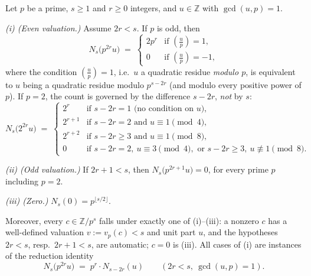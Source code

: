 \begin{lemma}\label{lem-3-2-6}
  \leanok
  Let $p$ be a prime, $s \geq 1$ and $r \geq 0$ integers, and $u \in \mathbb{Z}$
  with $\gcd(u,p) = 1$.

  \emph{(i) (Even valuation.)} Assume $2r < s$. If $p$ is odd, then
  \[
    N_s\bigl(p^{2r}u\bigr) \;=\;
    \begin{cases}
      2p^{r} & \text{if } \left(\frac{u}{p}\right) = 1,\\
      0      & \text{if } \left(\frac{u}{p}\right) = -1,
    \end{cases}
  \]
  where the condition $\left(\frac{u}{p}\right) = 1$, i.e.\ $u$ a quadratic residue
  \emph{modulo $p$}, is equivalent to $u$ being a quadratic residue modulo
  $p^{s-2r}$ (and modulo every positive power of $p$).
  If $p = 2$, the count is governed by the difference $s - 2r$, \emph{not} by $s$:
  \[
    N_s\bigl(2^{2r}u\bigr) \;=\;
    \begin{cases}
      2^{r}   & \text{if } s - 2r = 1 \text{ (no condition on } u\text{)},\\
      2^{r+1} & \text{if } s - 2r = 2 \text{ and } u \equiv 1 \pmod{4},\\
      2^{r+2} & \text{if } s - 2r \geq 3 \text{ and } u \equiv 1 \pmod{8},\\
      0       & \text{if } s - 2r = 2,\ u \equiv 3 \pmod{4},
                \text{ or } s - 2r \geq 3,\ u \not\equiv 1 \pmod{8}.
    \end{cases}
  \]

  \emph{(ii) (Odd valuation.)} If $2r + 1 < s$, then $N_s\bigl(p^{2r+1}u\bigr) = 0$,
  for every prime $p$ including $p = 2$.

  \emph{(iii) (Zero.)} $N_s(0) = p^{\lfloor s/2 \rfloor}$.

  Moreover, every $c \in \mathbb{Z}/p^s$ falls under exactly one of (i)--(iii):
  a nonzero $c$ has a well-defined valuation $v := v_p(c) < s$ and unit part $u$,
  and the hypotheses $2r < s$, resp.\ $2r + 1 < s$, are automatic; $c = 0$ is (iii).
  All cases of (i) are instances of the reduction identity
  \[
    N_s\bigl(p^{2r}u\bigr) \;=\; p^{r}\cdot N_{s-2r}(u)
    \qquad (2r < s,\ \gcd(u,p) = 1). \tag{$*$}
  \]
\end{lemma}

